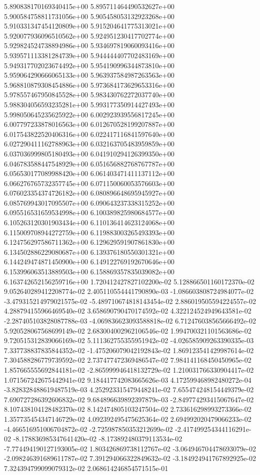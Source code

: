 5.890838170169340415e+00	5.895711464490532627e+00	5.900584758811731056e+00	5.905458053132923268e+00	5.910331347454120809e+00	5.915204641775313021e+00	5.920077936096510562e+00	5.924951230417702774e+00	5.929824524738894986e+00	5.934697819060093416e+00	5.939571113381284739e+00	5.944444407702483169e+00	5.949317702023674492e+00	5.954190996344873810e+00	5.959064290666065133e+00	5.963937584987263563e+00	5.968810879308454886e+00	5.973684173629653316e+00	5.978557467950845528e+00	5.983430762272037740e+00	5.988304056593235281e+00	5.993177350914427493e+00	5.998050645235625922e+00	6.002923939556817245e+00	6.007797233878016563e+00	6.012670528199207887e+00	6.017543822520406316e+00	6.022417116841597640e+00	6.027290411162788963e+00	6.032163705483959859e+00	6.037036999805180493e+00	6.041910294126399350e+00	6.046783588447548929e+00	6.051656882768767787e+00	6.056530177089988420e+00	6.061403471411137112e+00	6.066276765732357745e+00	6.071150060053576603e+00	6.076023354374726182e+00	6.080896648695945927e+00	6.085769943017095507e+00	6.090643237338315252e+00	6.095516531659534998e+00	6.100389825980684577e+00	6.105263120301903434e+00	6.110136414623124068e+00	6.115009708944272759e+00	6.119883003265493393e+00	6.124756297586711362e+00	6.129629591907861830e+00	6.134502886229080687e+00	6.139376180550301321e+00	6.144249474871450900e+00	6.149122769192670646e+00	6.153996063513889503e+00	6.158869357835039082e+00	6.163742652156259716e+00
1.720412427827102200e-02	5.128866501160172370e-02	9.052640289412208774e-02	2.405110554441790890e-03	-1.086603808724984077e-02	-3.479315214979021575e-02	-5.489710674818143454e-02	2.886019505594224557e-02	4.288794155966469540e-02	3.658690790470174592e-02	4.322124524949643581e-02	-2.287405103828087788e-03	-4.069836623093588818e-02	6.712476038565666492e-02	5.920528067568699149e-02	2.683004002962106546e-02	1.994700321101563686e-02	9.720515312839066169e-02	5.111362755355951942e-02	-4.026585909263390335e-03	7.337738837835844352e-02	-1.475206079042192843e-02	1.869123541429987614e-02	7.304588286779739592e-02	2.737477472369486547e-02	7.984141168450450965e-02	1.857665555692844181e-02	-2.865999946418132729e-02	1.210031766330904417e-02	1.071567242675442941e-02	9.184417742083665626e-03	4.172599468982480272e-04	-3.828328488619487519e-03	4.252923315479448241e-02	7.655474248154449379e-02	7.690727286392606832e-02	9.684896639892397879e-03	-2.849774293415067647e-02	8.107438104128482370e-02	8.142474805103247504e-02	2.733616298993273366e-02	1.357735454347146729e-02	4.092392495475625364e-02	2.694992020479066233e-02	-4.466516951006704872e-02	-2.725987850353212699e-02	-2.417499254344116291e-02	-8.178836985347641420e-02	-8.173892480379113534e-02	-7.774494190127193005e-02	1.803426869738112767e-02	-3.064946704478693079e-02	-2.098246391689611787e-02	7.391294066322849632e-02	-3.184924941767892925e-02	7.324394799099079312e-02	2.068614246854571515e-01
